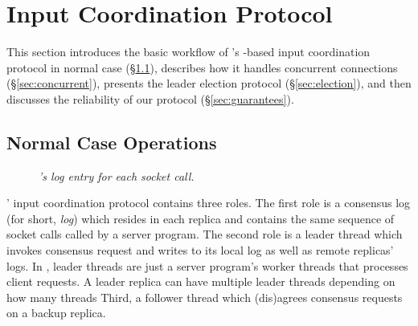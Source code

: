 \section{Input Coordination Protocol} \label{sec:input}

This section introduces the basic workflow of \xxx's \paxos-based input 
coordination protocol in normal case (\S\ref{sec:normal}), describes how it 
handles concurrent connections (\S\ref{sec:concurrent}), presents the leader 
election protocol (\S\ref{sec:election}), and then discusses the reliability 
of our protocol (\S\ref{sec:guarantees}).

\subsection{Normal Case Operations} \label{sec:normal}

\begin{figure}[t]
\centering
\begin{minipage}{.5\textwidth}
\end{minipage}
\vspace{-.1in}
\caption{{\em \xxx's log entry for each socket call.}} \label{fig:logentry}
\vspace{-.05in}
\end{figure}



\xxx' input coordination protocol contains three roles. The first role is a 
\paxos consensus log (for short, \emph{log}) which resides in each replica and 
contains the same  sequence of socket calls called by a server program. The 
second role is a leader thread which invokes consensus request and writes to its 
local log as well as remote replicas' logs. In \xxx, leader threads are just 
a server program's worker threads that processes client requests. A leader 
replica can have multiple leader threads depending on how many threads  Third, 
a follower thread which (dis)agrees consensus requests on a backup replica.

